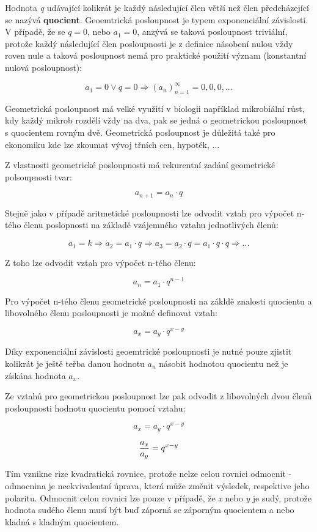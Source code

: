 Hodnota {\it q} udávající kolikrát je každý následující člen větší než člen  předcházející se nazývá {\bf quocient}. Geoemtrická posloupnost je typem exponenciální závislosti. V případě, že se $q = 0$, nebo $a_1 = 0$, anzývá se taková posloupnost triviální, protože každý následující člen posloupnosti je z definice násobení nulou vždy roven nule a taková posloupnost nemá pro praktické použití význam (konstantní nulová posloupnost):

$$ a_1 = 0 \vee q=0 \Rightarrow (a_n)_{n=1}^{\infty} = 0, 0, 0,... $$

Geometrická posloupnost má velké využití v biologii například mikrobiální růst, kdy každý mikrob rozdělí vždy na dva, pak se jedná o geometrickou posloupnost s quocientem rovným dvě. Geometrická posloupnost je důležitá také pro ekonomiku kde lze zkoumat vývoj třních cen, hypoték, ...


Z vlastnosti geometrické posloupnosti má rekurentní zadání geometrické polsoupnosti tvar:

$$ a_{n+1} = a_n \cdot q $$

Stejně jako v případě aritmetické posloupnosti lze odvodit vztah pro výpočet n-tého členu poslopnosti na základě vzájemného vztahu jednotlivých členů:

$$a_1 = k \Rightarrow a_2 = a_1 \cdot q \Rightarrow a_3 = a_2 \cdot q = a_1 \cdot q \cdot q \Rightarrow ... $$

Z toho lze odvodit vztah pro výpočet n-tého členu:

$$ a_n = a_1 \cdot q^{n-1} $$

Pro výpočet n-tého členu geometrické posloupnosti na zákldě znalosti quocientu a libovolného členu posloupnosti je možné definovat vztah:

$$ a_x = a_y \cdot q^{x-y} $$

Díky exponenciální závislosti geoemtrické posloupnosti je nutné pouze zjistit kolikrát je ještě teřba danou hodnotu $a_n$ násobit hodnotou quocientu než je získána hodnota $a_x$.


Ze vztahů pro geometrickou posloupnost lze pak odvodit z libovolných dvou členů posloupnosti hodnotu quocientu pomocí vztahu:

$$ a_x = a_y \cdot q^{x-y} $$

$$ {a_x \over a_y} = q^{x-y} $$

Tím vznikne rize kvadratická rovnice, protože nelze celou rovnici odmocnit - odmocnina je neekvivalentní úprava, která může změnit výsledek, respektive jeho polaritu. Odmocnit celou rovnici lze pouze v případě, že {\it x} nebo {\it y} je sudý, protože hodnota sudého členu musí být buď záporná se záporným quocientem a nebo kladná s kladným quocientem.

